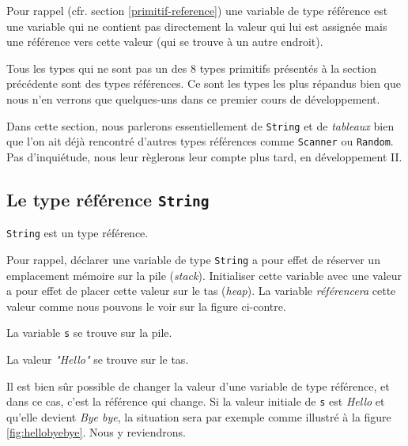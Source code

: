 Pour rappel (cfr. section \vref{primitif-reference}) une variable de type
référence est une variable qui ne contient pas directement la valeur qui lui
est assignée mais une référence vers cette valeur (qui se trouve à un autre
endroit).  

Tous les types qui ne sont pas un des 8 types primitifs présentés à la section
précédente sont des types références. Ce sont les types les plus répandus bien
que nous n'en verrons que quelques-uns dans ce premier cours de développement. 

Dans cette section, nous parlerons essentiellement de \texttt{String} et de
\textit{tableaux} bien que l'on ait déjà rencontré d'autres types références
comme \texttt{Scanner} ou \texttt{Random}. Pas d'inquiétude, nous leur règlerons
leur compte plus tard, en développement II. 

\subsection{Le type référence \texttt{String}}

\texttt{String} est un type référence. 

\begin{figure}
	\begin{center}
	\end{center}
\end{figure}

Pour rappel, déclarer une variable de type \texttt{String} a pour effet de
réserver un emplacement mémoire sur la pile (\textit{stack}). Initialiser cette
variable avec une valeur a pour effet de placer cette valeur sur le tas
(\textit{heap}). La variable \textit{référencera} cette valeur comme nous
pouvons le voir sur la figure ci-contre. 

La variable \texttt{s} se trouve sur la pile. 

La valeur \textit{"Hello"} se trouve sur le tas. 

Il est bien sûr possible de changer la valeur d'une variable de type référence,
et dans ce cas, c'est la référence qui change. Si la valeur initiale de
\texttt{s} est \textit{Hello} et qu'elle devient \textit{Bye bye}, la situation
sera par exemple comme illustré à la figure \vref{fig:hellobyebye}. Nous
y reviendrons. 


